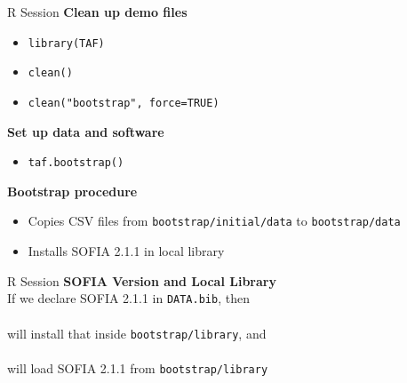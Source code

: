 \documentclass[aspectratio=169]{beamer}
\begin{document}

\begin{frame}[fragile]{R Session}
  \textbf{\darkgreen Clean up demo files}
  \begin{itemize}
    \item[] \verb|library(TAF)|\\[0.5ex]
    \item[] \verb|clean()|\\[0.5ex]
    \item[] \verb|clean("bootstrap", force=TRUE)|\\[1ex]
  \end{itemize}
  \vspace{2ex}
  \textbf{\darkgreen Set up data and software}
  \begin{itemize}
    \item[] \verb|taf.bootstrap()|\\[1ex]
  \end{itemize}
  \vspace{2ex}
  \textbf{\darkgreen Bootstrap procedure}\\[0.3ex]
  \begin{itemize}
    \item[] Copies CSV files from \verb|bootstrap/initial/data| to
    \verb|bootstrap/data|\\[1.2ex]
    \item[] Installs SOFIA 2.1.1 in local library\\[1ex]
  \end{itemize}
\end{frame}


\begin{frame}{R Session}
  \textbf{\darkgreen SOFIA Version and Local Library}\\[1.5ex]
  If we declare SOFIA 2.1.1 in {\tt DATA.bib}, then\\[0.8ex]
  \\[0.8ex]
  will {\darkgreen install} that inside {\tt bootstrap/library}, and\\[0.8ex]
  \\[0.8ex]
  will {\darkgreen load} SOFIA 2.1.1 from {\tt bootstrap/library}
\end{frame}

\end{document}
